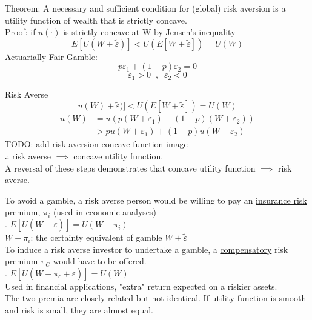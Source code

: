 \documentclass[
14pt,notheorems,hyperref={pdfauthor=whatever}
]{beamer}
\begin{document}
\begin{frame}
Theorem: A necessary and sufficient condition for (global) risk aversion is a utility function of wealth that is strictly concave.\\
\hfill \break
Proof: if $u(\cdot)$ is strictly concave at W by Jensen's inequality\\
\[ E[U(W+\tilde\varepsilon)] < U(E[W+\tilde\varepsilon]) = U(W)\]
\hfill \break
Actuarially Fair Gamble:\\
\[p\varepsilon_1+(1-p)\varepsilon_2 = 0\]
\[\varepsilon_1>0\;\;,\;\;\varepsilon_2<0\]
\end{frame}

\begin{frame}
Risk Averse\\
\hfill \break
\[ u(W)+\tilde\varepsilon)] < U(E[W+\tilde\varepsilon]) = U(W)\]
\begin{align*}
    u(W) &= u(p(W+\varepsilon_1)+(1-p)(W+\varepsilon_2))\\
    &> p u(W+\varepsilon_1)+(1-p)u(W+\varepsilon_2)
\end{align*}
TODO: add risk aversion concave function image\\
$\therefore$ risk averse $\implies$ concave utility function.\\
A reversal of these steps demonstrates that concave utility function $\implies$ risk averse.\\
\end{frame}

\begin{frame}
To avoid a gamble, a risk averse person would be willing to pay an \underline{insurance risk premium}, $\pi_i$ (used in economic analyses)\\
\hfill {}. $E[U(W+\tilde\varepsilon)] = U(W-\pi_i)$\\
\hfill \break
$W-\pi_i$: the certainty equivalent of gamble $W+\tilde\varepsilon$\\
To induce a risk averse investor to undertake a gamble, a \underline{compensatory} risk premium $\pi_C$ would have to be offered.\\
\hfill {}. $E[U(W+\pi_c+\tilde\varepsilon)] = U(W)$\\
\hfill \break
Used in financial applications, "extra" return expected on a riskier assets.\\
\hfill \break
The two premia are closely related but not identical. If utility function is smooth and risk is small, they are almost equal.\\
\end{frame}
\end{document}
